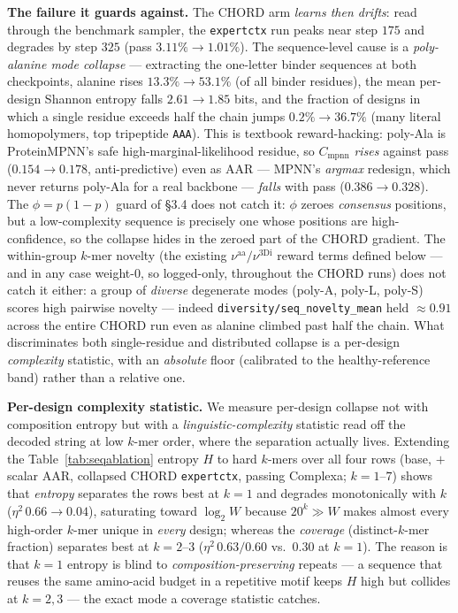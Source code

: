 \documentclass[11pt]{article}
\newcommand{\ttk}[1]{\texttt{\small #1}}
\begin{document}
\textbf{The failure it guards against.} The CHORD arm \emph{learns then drifts}: read through the
benchmark sampler, the \ttk{expertctx} run peaks near step $175$ and degrades by step $325$ (pass
$3.11\%\!\to\!1.01\%$). The sequence-level cause is a \emph{poly-alanine mode collapse} --- extracting
the one-letter binder sequences at both checkpoints, alanine rises $13.3\%\!\to\!53.1\%$ (of all binder
residues), the mean per-design Shannon entropy falls $2.61\!\to\!1.85$ bits, and the fraction of designs
in which a single residue exceeds half the chain jumps $0.2\%\!\to\!36.7\%$ (many literal homopolymers,
top tripeptide \ttk{AAA}). This is textbook reward-hacking: poly-Ala is ProteinMPNN's safe
high-marginal-likelihood residue, so $C_{\mathrm{mpnn}}$ \emph{rises} against pass ($0.154\!\to\!0.178$,
anti-predictive) even as AAR --- MPNN's \emph{argmax} redesign, which never returns poly-Ala for a real
backbone --- \emph{falls} with pass ($0.386\!\to\!0.328$). The $\phi=p(1{-}p)$ guard of \S3.4 does not
catch it: $\phi$ zeroes \emph{consensus} positions, but a low-complexity sequence is precisely one whose
positions are high-confidence, so the collapse hides in the zeroed part of the CHORD gradient. The
within-group $k$-mer novelty (the existing $\nu^{\mathrm{aa}}/\nu^{\mathrm{3Di}}$ reward terms defined
below --- and in any case weight-$0$, so logged-only, throughout the CHORD runs) does not catch it
either: a group of \emph{diverse} degenerate modes (poly-A, poly-L, poly-S) scores high pairwise
novelty --- indeed \ttk{diversity/seq\_novelty\_mean} held $\approx\!0.91$ across the entire CHORD run
even as alanine climbed past half the chain. What discriminates both single-residue and
distributed collapse is a per-design \emph{complexity} statistic, with an \emph{absolute} floor
(calibrated to the healthy-reference band) rather than a relative one.

\textbf{Per-design complexity statistic.} We measure per-design collapse not with
composition entropy but with a \emph{linguistic-complexity} statistic read off the decoded string at low
$k$-mer order, where the separation actually lives. Extending the Table~\ref{tab:seqablation} entropy $H$ to hard $k$-mers over
all four rows (base, $+$scalar AAR, collapsed CHORD \ttk{expertctx}, passing Complexa; $k{=}1$--$7$)
shows that \emph{entropy} separates the rows best at $k{=}1$ and degrades monotonically with $k$
($\eta^2\,0.66\!\to\!0.04$), saturating toward $\log_2 W$ because $20^k\!\gg\!W$ makes almost every
high-order $k$-mer unique in \emph{every} design; whereas the \emph{coverage} (distinct-$k$-mer
fraction) separates best at $k{=}2$--$3$ ($\eta^2\,0.63/0.60$ vs.\ $0.30$ at $k{=}1$). The reason is
that $k{=}1$ entropy is blind to \emph{composition-preserving} repeats --- a sequence that reuses the
same amino-acid budget in a repetitive motif keeps $H$ high but collides at $k{=}2,3$ --- the exact
mode a coverage statistic catches.
\end{document}
